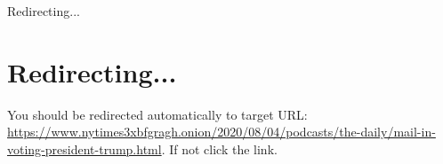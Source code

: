 Redirecting...

\hypertarget{redirecting}{%
\section{Redirecting...}\label{redirecting}}

You should be redirected automatically to target URL:
\href{https://www.nytimes3xbfgragh.onion/2020/08/04/podcasts/the-daily/mail-in-voting-president-trump.html}{https://www.nytimes3xbfgragh.onion/2020/08/04/podcasts/the-daily/mail-in-voting-president-trump.html}.
If not click the link.
